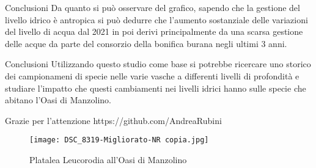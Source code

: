 \documentclass{beamer} %
\begin{document}
        \begin{frame}{Conclusioni}
        Da quanto si può osservare del grafico, sapendo che la gestione del livello idrico è antropica si può dedurre che l'aumento sostanziale delle variazioni del livello di acqua dal 2021 in poi derivi principalmente da una scarsa gestione  delle acque da parte del consorzio della bonifica burana negli ultimi 3 anni.
        \end{frame}
\begin{frame}{Conclusioni}
    Utilizzando questo studio come base si potrebbe ricercare uno storico dei campionameni di specie nelle varie vasche a differenti livelli di profondità e studiare l'impatto che questi cambiamenti nei livelli idrici hanno sulle specie che abitano l'Oasi di Manzolino.
\end{frame}
\begin{frame}{Grazie per l'attenzione}
https://github.com/AndreaRubini
    \begin{figure}
        \centering
        \texttt{[image: DSC\_8319-Migliorato-NR copia.jpg]}
        \caption{Platalea Leucorodia all'Oasi di Manzolino}
        \label{fig:enter-label}
    \end{figure}
\end{frame}
\end{document}

